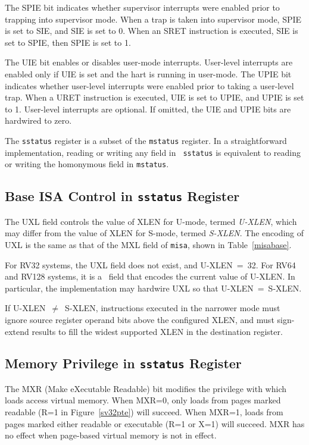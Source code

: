 The SPIE bit indicates whether supervisor interrupts were enabled prior to
trapping into supervisor mode.  When a trap is taken into supervisor
mode, SPIE is set to SIE, and SIE is set to 0.  When an SRET instruction is
executed, SIE is set to SPIE, then SPIE is set to 1.

The UIE bit enables or disables user-mode interrupts.  User-level interrupts
are enabled only if UIE is set and the hart is running in user-mode.  The UPIE
bit indicates whether user-level interrupts were enabled prior to taking
a user-level trap.  When a URET instruction is executed, UIE is
set to UPIE, and UPIE is set to 1.  User-level interrupts are optional.  If
omitted, the UIE and UPIE bits are hardwired to zero.

\begin{commentary}
The {\tt sstatus} register is a subset of the {\tt mstatus} register.  In
a straightforward implementation, reading or writing any field in {\tt
sstatus} is equivalent to reading or writing the homonymous field in
{\tt mstatus}.
\end{commentary}

\subsection{Base ISA Control in {\tt sstatus} Register}

The UXL field controls the value of XLEN for U-mode, termed {\em U-XLEN},
which may differ from the value of XLEN for S-mode, termed {\em S-XLEN}.  The
encoding of UXL is the same as that of the MXL field of {\tt misa}, shown in
Table~\ref{misabase}.

For RV32 systems, the UXL field does not exist, and U-XLEN~=~32.  For RV64 and
RV128 systems, it is a \warl\ field that encodes the current value of U-XLEN.
In particular, the implementation may hardwire UXL so that U-XLEN~=~S-XLEN.

If U-XLEN~$\ne$~S-XLEN, instructions executed in the narrower mode must ignore
source register operand bits above the configured XLEN, and must sign-extend
results to fill the widest supported XLEN in the destination register.

\subsection{Memory Privilege in {\tt sstatus} Register}
\label{sec:sum}

The MXR (Make eXecutable Readable) bit modifies the privilege with which loads
access virtual memory.  When MXR=0, only loads from pages marked readable (R=1
in Figure~\ref{sv32pte}) will succeed.  When MXR=1, loads from pages marked
either readable or executable (R=1 or X=1) will succeed.  MXR has no effect
when page-based virtual memory is not in effect.

